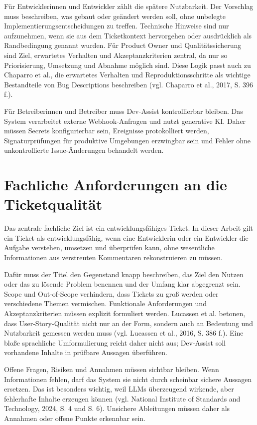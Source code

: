 \documentclass[12pt,a4paper,oneside]{scrreprt}
\begin{document}
Für Entwicklerinnen und Entwickler zählt die spätere Nutzbarkeit. Der Vorschlag muss beschreiben, was gebaut oder geändert werden soll, ohne unbelegte Implementierungsentscheidungen zu treffen. Technische Hinweise sind nur aufzunehmen, wenn sie aus dem Ticketkontext hervorgehen oder ausdrücklich als Randbedingung genannt wurden. Für Product Owner und Qualitätssicherung sind Ziel, erwartetes Verhalten und Akzeptanzkriterien zentral, da nur so Priorisierung, Umsetzung und Abnahme möglich sind. Diese Logik passt auch zu Chaparro et al., die erwartetes Verhalten und Reproduktionsschritte als wichtige Bestandteile von Bug Descriptions beschreiben (vgl. Chaparro et al., 2017, S. 396 f.).

Für Betreiberinnen und Betreiber muss Dev-Assist kontrollierbar bleiben. Das System verarbeitet externe Webhook-Anfragen und nutzt generative KI. Daher müssen Secrets konfigurierbar sein, Ereignisse protokolliert werden, Signaturprüfungen für produktive Umgebungen erzwingbar sein und Fehler ohne unkontrollierte Issue-Änderungen behandelt werden.

\section{Fachliche Anforderungen an die Ticketqualität}

Das zentrale fachliche Ziel ist ein entwicklungsfähiges Ticket. In dieser Arbeit gilt ein Ticket als entwicklungsfähig, wenn eine Entwicklerin oder ein Entwickler die Aufgabe verstehen, umsetzen und überprüfen kann, ohne wesentliche Informationen aus verstreuten Kommentaren rekonstruieren zu müssen.

Dafür muss der Titel den Gegenstand knapp beschreiben, das Ziel den Nutzen oder das zu lösende Problem benennen und der Umfang klar abgegrenzt sein. Scope und Out-of-Scope verhindern, dass Tickets zu groß werden oder verschiedene Themen vermischen. Funktionale Anforderungen und Akzeptanzkriterien müssen explizit formuliert werden. Lucassen et al. betonen, dass User-Story-Qualität nicht nur an der Form, sondern auch an Bedeutung und Nutzbarkeit gemessen werden muss (vgl. Lucassen et al., 2016, S. 386 f.). Eine bloße sprachliche Umformulierung reicht daher nicht aus; Dev-Assist soll vorhandene Inhalte in prüfbare Aussagen überführen.

Offene Fragen, Risiken und Annahmen müssen sichtbar bleiben. Wenn Informationen fehlen, darf das System sie nicht durch scheinbar sichere Aussagen ersetzen. Das ist besonders wichtig, weil LLMs überzeugend wirkende, aber fehlerhafte Inhalte erzeugen können (vgl. National Institute of Standards and Technology, 2024, S. 4 und S. 6). Unsichere Ableitungen müssen daher als Annahmen oder offene Punkte erkennbar sein.
\end{document}
